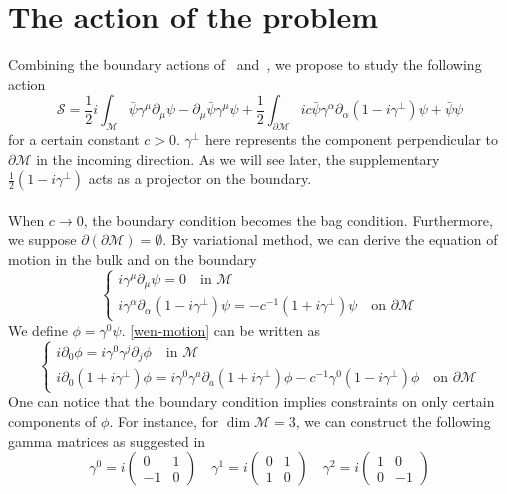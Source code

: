 \section{The action of the problem}
Combining the boundary actions of~\cite{Henningson1998} and~\cite{Contino2005}, we propose to study the following action
\begin{equation}\label{wen-action}
\mathcal{S} = \frac{1}{2}i\int_{\mathcal{M}} \bar{\psi} \gamma^\mu \partial_\mu \psi - \partial_\mu \bar{\psi} \gamma^\mu \psi 
+ \frac{1}{2}\int_{\partial \mathcal{M}} ic \bar{\psi} \gamma^\alpha \partial_\alpha (1 - i \gamma^\bot) \psi
+ \bar{\psi} \psi
\end{equation}
for a certain constant $c >0$. 
$\gamma^\bot$ here represents the component perpendicular to $\partial \mathcal{M}$ in the incoming direction. 
As we will see later, the supplementary $\frac 1 2 (1-i\gamma^\bot)$ acts as a projector on the boundary.
\\\\
When $c \rightarrow 0$, the boundary condition becomes the bag condition. 
Furthermore, we suppose $\partial(\partial \mathcal{M}) = \emptyset$.
By variational method, we can derive the equation of motion in the bulk and on the boundary
\begin{equation}\label{wen-motion}
\begin{cases}
i \gamma^\mu \partial_\mu \psi = 0  \quad \textrm{in $\mathcal{M}$}\\
i \gamma^\alpha \partial_\alpha (1 - i\gamma^\bot) \psi = - c^{-1}(1 + i\gamma^{\bot}) \psi \quad \textrm{on $\partial \mathcal{M}$}
\end{cases}
\end{equation}
We define $\phi = \gamma^0 \psi$. 
\cref{wen-motion} can be written as 
\begin{equation}\label{wen-maineq}
\begin{cases}
i \partial_0 \phi = i \gamma^0 \gamma^j \partial_j \phi   \quad \textrm{in $\mathcal{M}$}\\
i \partial_0(1 + i\gamma^\bot) \phi = i\gamma^0 \gamma^a \partial_a (1+ i\gamma^\bot)\phi - c^{-1} \gamma^0(1 - i \gamma^{\bot})\phi \quad \textrm{on $\partial \mathcal{M}$}
\end{cases}
\end{equation}
One can notice that the boundary condition implies constraints on only certain components of $\phi$. 
For instance, for $\dim \mathcal{M} = 3$, we can construct the following gamma matrices as suggested in~\cite{Polchinski1998}
\begin{equation*}
\gamma^0 = i\begin{pmatrix} 0 & 1 \\ -1 & 0 \end{pmatrix}  \quad
\gamma^1 = i\begin{pmatrix} 0 & 1 \\ 1 & 0 \end{pmatrix}  \quad
\gamma^2 = i\begin{pmatrix} 1 & 0 \\ 0 & -1 \end{pmatrix}  
\end{equation*}
